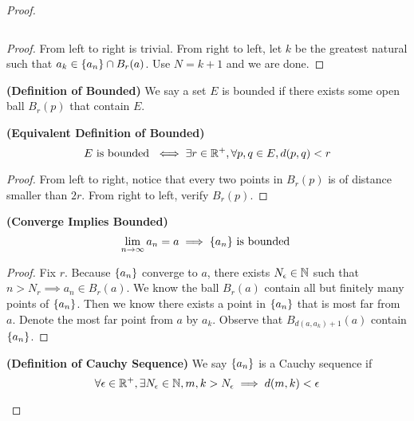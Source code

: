 \documentclass{report}
\begin{document}
\begin{proof}
\begin{theorem}
\begin{equation}
\end{equation}
\end{theorem}
\begin{proof}
From left to right is trivial. From right to left, let $k$ be the greatest natural such that $a_k\in \{ a_n \}\cap B_r(a)$. Use $N=k+1$ and we are done.
\end{proof}
\begin{definition}
\label{1.7.5}
\textbf{(Definition of Bounded)} We say a set $E$ is bounded if there exists some open ball $B_r(p)$ that contain $E$.
\end{definition}
\begin{theorem}
\label{1.7.6}
\textbf{(Equivalent Definition of Bounded)} 
\begin{equation}
E\text{ is bounded }\iff \exists r\in\mathbb{R}^+, \forall p,q\in E, d(p,q)<r 
\end{equation}
\end{theorem}
\begin{proof}
From left to right, notice that every two points in $B_r(p)$ is of distance smaller than $2r$. From right to left, verify $B_r(p)$. 
\end{proof}
\begin{theorem}
\label{1.7.7}
\textbf{(Converge Implies Bounded)}
\begin{equation}
\lim_{n\to\infty} a_n=a\implies \{ a_n \}\text{ is bounded }
\end{equation}
\end{theorem}
\begin{proof}
Fix $r $. Because $\{ a_n \}$ converge to $a$, there exists $N_\epsilon \in\mathbb{N}$ such that $n> N_r \implies a_n\in B_r (a)$. We know the ball $B_r(a)$ contain all but finitely many points of $\{ a_n \}$. Then we know there exists a point in $\{ a_n \}$ that is most far from $a$. Denote the most far point from $a$ by $a_k$. Observe that  $B_{d(a,a_k)+1}(a)$ contain $\{ a_n \}$. 
\end{proof}
\begin{definition}
\label{1.7.8}
\textbf{(Definition of Cauchy Sequence)} We say $\{ a_n \}$ is a Cauchy sequence if 
\begin{equation}
\forall \epsilon \inr^+,\exists N_\epsilon\inn, m,k>N_\epsilon  \implies d(m,k)<\epsilon 

\end{equation}
\end{definition}
\end{proof}
\end{document}
